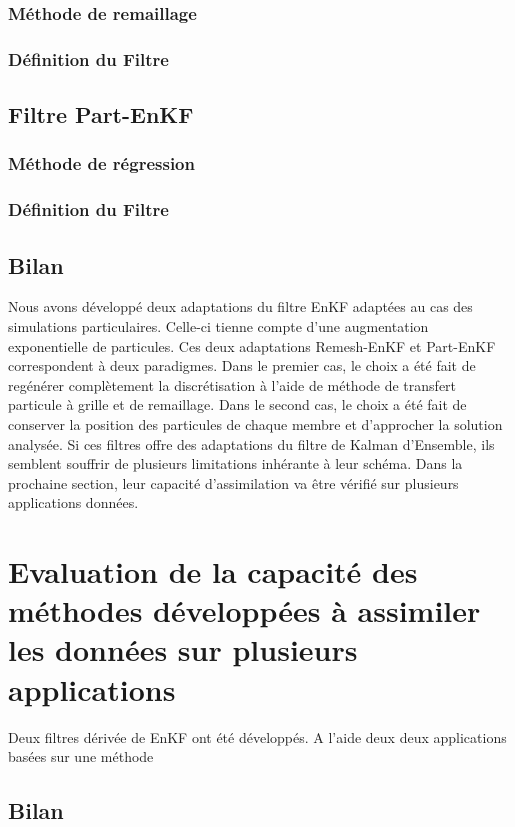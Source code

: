 \subsubsection{Méthode de remaillage}
\subsubsection{Définition du Filtre}
\subsection{Filtre Part-EnKF}
\subsubsection{Méthode de régression}
\subsubsection{Définition du Filtre}

\subsubsection{}

\subsection{Bilan}

Nous avons développé deux adaptations du filtre EnKF adaptées au cas des simulations particulaires. Celle-ci tienne compte d'une augmentation exponentielle de particules.
Ces deux adaptations Remesh-EnKF et Part-EnKF correspondent à deux paradigmes. Dans le premier cas, le choix a été fait de regénérer complètement la discrétisation à l'aide de méthode de transfert particule à grille et de remaillage. Dans le second cas, le choix a été fait de conserver la position des particules de chaque membre et d'approcher la solution analysée.
Si ces filtres offre des adaptations du filtre de Kalman d'Ensemble, ils semblent souffrir de plusieurs limitations inhérante à leur schéma. Dans la prochaine section, leur capacité d'assimilation va être vérifié sur plusieurs applications données.

\section{Evaluation de la capacité des méthodes développées à assimiler les données sur plusieurs applications}

Deux filtres dérivée de EnKF ont été développés. A l'aide deux deux applications basées sur une méthode


\subsection{Bilan}
